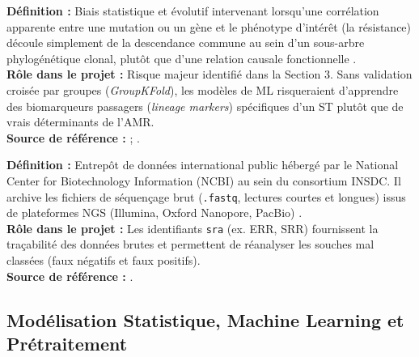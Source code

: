 \documentclass[11pt,a4paper]{article}
\begin{document}
\begin{defbox}
\textbf{Définition :} Biais statistique et évolutif intervenant lorsqu'une corrélation apparente entre une mutation ou un gène et le phénotype d'intérêt (la résistance) découle simplement de la descendance commune au sein d'un sous-arbre phylogénétique clonal, plutôt que d'une relation causale fonctionnelle \citep{earle2016identifying,lees2016sequence}.\\
\textbf{Rôle dans le projet :} Risque majeur identifié dans la Section 3. Sans validation croisée par groupes (\textit{GroupKFold}), les modèles de ML risqueraient d'apprendre des biomarqueurs passagers (\textit{lineage markers}) spécifiques d'un ST plutôt que de vrais déterminants de l'AMR.\\
\textbf{Source de référence :} \citet{earle2016identifying} ; \citet{lees2016sequence}.
\end{defbox}

\begin{defbox}
\textbf{Définition :} Entrepôt de données international public hébergé par le National Center for Biotechnology Information (NCBI) au sein du consortium INSDC. Il archive les fichiers de séquençage brut (\texttt{.fastq}, lectures courtes et longues) issus de plateformes NGS (Illumina, Oxford Nanopore, PacBio) \citep{leinonen2011sequence}.\\
\textbf{Rôle dans le projet :} Les identifiants \texttt{sra} (ex. ERR, SRR) fournissent la traçabilité des données brutes et permettent de réanalyser les souches mal classées (faux négatifs et faux positifs).\\
\textbf{Source de référence :} \citet{leinonen2011sequence}.
\end{defbox}

\subsection{Modélisation Statistique, Machine Learning et Prétraitement}
\end{document}
